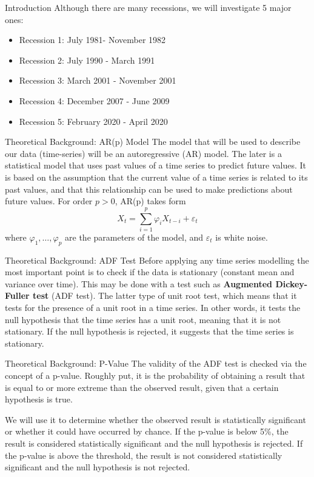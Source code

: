 \documentclass[11pt]{beamer}
\begin{document}
\begin{frame}{Introduction}
Although there are many recessions, we will investigate 5 major ones:
\begin{itemize}
    \item Recession 1: July 1981- November 1982
    \item Recession 2: July 1990 - March 1991
    \item Recession 3: March 2001 - November 2001
    \item Recession 4: December 2007 - June 2009
    \item Recession 5: February 2020 - April 2020
\end{itemize}
\end{frame}

\begin{frame}{Theoretical Background: AR(p) Model}
The model that will be used to describe our data (time-series) will be an autoregressive (AR) model. The later is a statistical model that uses past values of a time series to predict future values. It is based on the assumption that the current value of a time series is related to its past values, and that this relationship can be used to make predictions about future values. For order $p>0$, AR(p) takes form 
$$
X_t=\sum_{i=1}^p \varphi_i X_{t-i}+\varepsilon_t
$$
where $\varphi_1, \ldots, \varphi_p$ are the parameters of the model, and $\varepsilon_t$ is white noise.
\end{frame}

\begin{frame}{Theoretical Background: ADF Test}
Before applying any time series modelling the most important point is to check if the data is stationary (constant mean and variance over time). This may be done with a test such as \textbf{Augmented Dickey-Fuller test} (ADF test). The latter  type of unit root test, which means that it tests for the presence of a unit root in a time series. In other words, it tests the null hypothesis that the time series has a unit root, meaning that it is not stationary. If the null hypothesis is rejected, it suggests that the time series is stationary.
\end{frame}


\begin{frame}{Theoretical Background: P-Value}
The validity of the ADF test is checked via the concept of a p-value. Roughly put, it is the probability of obtaining a result that is equal to or more extreme than the observed result, given that a certain hypothesis is true.\par 

We will use it to determine whether the observed result is statistically significant or whether it could have occurred by chance. If the p-value is below 5\%, the result is considered statistically significant and the null hypothesis is rejected. If the p-value is above the threshold, the result is not considered statistically significant and the null hypothesis is not rejected.
\end{frame}
\end{document}
